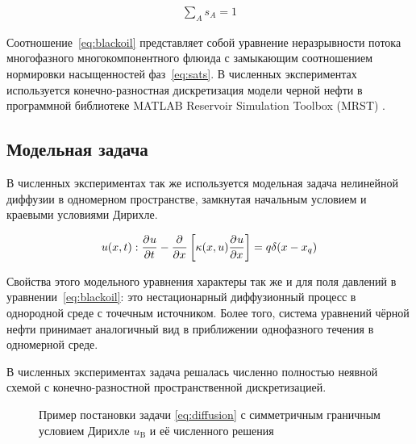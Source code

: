 \begin{align}
    \label{eq:sats}
    \sum_A s_A = 1
\end{align}

Соотношение~\ref{eq:blackoil} представляет собой уравнение неразрывности потока многофазного многокомпонентного флюида с замыкающим соотношением нормировки насыщенностей фаз~\ref{eq:sats}.
В численных экспериментах используется конечно-разностная дискретизация модели черной нефти в программной библиотеке MATLAB Reservoir Simulation Toolbox (MRST) \todo{\cite{}}.

\subsection{Модельная задача}

В численных экспериментах так же используется модельная задача нелинейной диффузии в одномерном пространстве, замкнутая начальным условием и краевыми условиями Дирихле.

\begin{equation} \label{eq:diffusion}
   u(x,t): \frac{\partial^{} u}{\partial t^{}} - \frac{\partial^{} }{\partial x^{}} \left[\kappa(x, u) \frac{\partial^{} u}{\partial x^{}} \right]= q \delta (x - x_q)
\end{equation}

Свойства этого модельного уравнения характеры так же и для поля давлений в уравнении~\ref{eq:blackoil}: это нестационарный диффузионный процесс в однородной среде с точечным источником. Более того, система уравнений чёрной нефти принимает аналогичный вид в приближении однофазного течения в одномерной среде.

В численных экспериментах задача решалась численно полностью неявной схемой с конечно-разностной пространственной дискретизацией.

\begin{figure}[ht]
    \caption{Пример постановки задачи \ref{eq:diffusion} с симметричным граничным условием Дирихле $u_\text{B}$ и её численного решения \cite{Elizarev2022}}\label{fig:FOM}
\end{figure}



